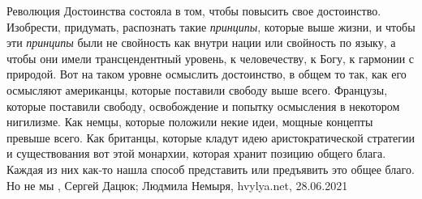Революция Достоинства состояла в том, чтобы повысить свое достоинство.
Изобрести, придумать, распознать такие \emph{принципы}, которые выше жизни, и
чтобы эти \emph{принципы} были не свойность как внутри нации или свойность по
языку, а чтобы они имели трансцендентный уровень, к человечеству, к Богу, к
гармонии с природой. Вот на таком уровне осмыслить достоинство, в общем то так,
как его осмысляют американцы, которые поставили свободу выше всего. Французы,
которые поставили свободу, освобождение и попытку осмысления в некотором
нигилизме. Как немцы, которые положили некие идеи, мощные концепты превыше
всего. Как британцы, которые кладут идею аристократической стратегии и
существования вот этой монархии, которая хранит позицию общего блага. Каждая из
них как-то нашла способ представить или предъявить это общее благо. Но не мы
, 
Сергей Дацюк; Людмила Немыря, hvylya.net, 28.06.2021

